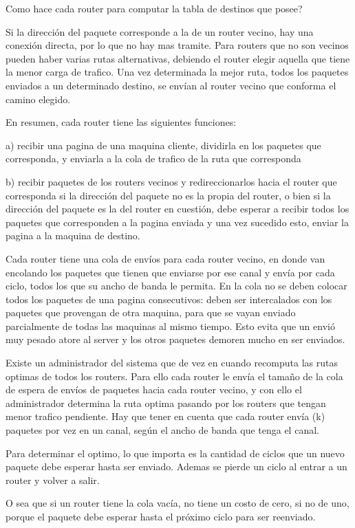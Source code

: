 \documentclass[12pt]{article} %
\begin{document}
Como hace cada router para computar la tabla de destinos que posee?

Si la dirección del paquete corresponde a la de un router vecino, hay una conexión directa, por lo que no hay mas tramite. Para routers que no son vecinos pueden haber varias rutas alternativas, debiendo el router elegir aquella que tiene la menor carga de trafico. Una vez determinada la mejor ruta, todos los paquetes enviados a un determinado destino, se envían al router vecino que conforma el camino elegido.

En resumen, cada router tiene las siguientes funciones:

a) recibir una pagina de una maquina cliente, dividirla en los paquetes que corresponda, y enviarla a la cola de trafico de la ruta que corresponda

b) recibir paquetes de los routers vecinos y redireccionarlos hacia el router que corresponda si la dirección del paquete no es la propia del router, o bien si la dirección del paquete es la del router en cuestión, debe esperar a recibir todos los paquetes que corresponden a la pagina enviada y una vez sucedido esto, enviar la pagina a la maquina de destino.

Cada router tiene una cola de envíos para cada router vecino, en donde van encolando los paquetes que tienen que enviarse por ese canal y envía por cada ciclo, todos los que su ancho de banda le permita. En la cola no se deben colocar todos los paquetes de una pagina consecutivos: deben ser intercalados con los paquetes que provengan de otra maquina, para que se vayan enviado parcialmente de todas las maquinas al mismo tiempo. Esto evita que un envió muy pesado atore al server y los otros paquetes demoren mucho en ser enviados.

Existe un administrador del sistema que de vez en cuando recomputa las rutas optimas de todos los routers. Para ello cada router le envía el tamaño de la cola de espera de envíos de paquetes hacia cada router vecino, y con ello el administrador determina la ruta optima pasando por los routers que tengan menor trafico pendiente. Hay que tener en cuenta que cada router envía (k) paquetes por vez en un canal, según el ancho de banda que tenga el canal.

Para determinar el optimo, lo que importa es la cantidad de ciclos que un nuevo paquete debe esperar hasta ser enviado. Ademas se pierde un ciclo al entrar a un router y volver a salir.

O sea que si un router tiene la cola vacía, no tiene un costo de cero, si no de uno, porque el paquete debe esperar hasta el próximo ciclo para ser reenviado.
\end{document}
